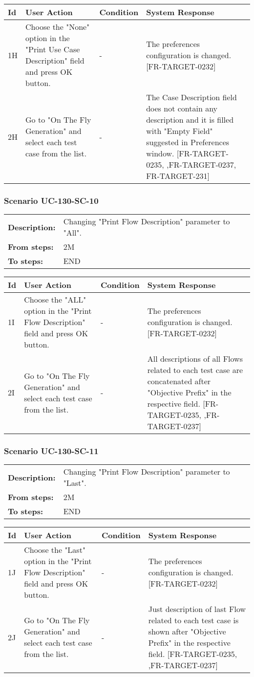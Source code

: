 \documentclass[a4paper,11pt]{article}
\newcommand{\bl}{\\ \hline}
\begin{document}
\begin{tabular}{|p{0.8in}|p{1.6in}|p{1.6in}|p{1.6in}|}
\hline
Id & User Action & Condition & System Response  \bl 
1H & Choose the  "None" option in the "Print Use Case Description" field and press OK button. & - & The preferences configuration is changed. [FR-TARGET-0232] \bl 
2H & Go to "On The Fly Generation" and select each test case from the list. & - & The Case Description field does not contain any description and it is filled with "Empty Field" suggested in Preferences window. [FR-TARGET-0235, ,FR-TARGET-0237, FR-TARGET-231] \bl 
\end{tabular}
\subsubsection*{Scenario UC-130-SC-10}
\begin{tabular}{p{1in}p{4in}}
{\bf Description:} & Changing "Print Flow Description" parameter to "All". \\
{\bf From steps:} & 2M \\
{\bf To steps:} & END \\
\end{tabular}
 
\begin{tabular}{|p{0.8in}|p{1.6in}|p{1.6in}|p{1.6in}|}
\hline
Id & User Action & Condition & System Response  \bl 
1I & Choose the "ALL" option in the "Print Flow Description" field and press OK button. & - & The preferences configuration is changed. [FR-TARGET-0232] \bl 
2I & Go to "On The Fly Generation" and select each test case from the list. & - & All descriptions of all Flows related to each test case are concatenated after "Objective Prefix" in the respective field. [FR-TARGET-0235, ,FR-TARGET-0237] \bl 
\end{tabular}
\subsubsection*{Scenario UC-130-SC-11}
\begin{tabular}{p{1in}p{4in}}
{\bf Description:} & Changing "Print Flow Description" parameter to "Last". \\
{\bf From steps:} & 2M \\
{\bf To steps:} & END \\
\end{tabular}
 
\begin{tabular}{|p{0.8in}|p{1.6in}|p{1.6in}|p{1.6in}|}
\hline
Id & User Action & Condition & System Response  \bl 
1J & Choose the "Last" option in the "Print Flow Description" field and press OK button. & - & The preferences configuration is changed. [FR-TARGET-0232] \bl 
2J & Go to "On The Fly Generation" and select each test case from the list. & - & Just description of last Flow related to each test case is shown after "Objective Prefix" in the respective field. [FR-TARGET-0235, ,FR-TARGET-0237] \bl 
\end{tabular}
\end{document}
